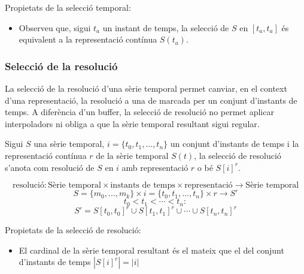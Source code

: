 Propietats de la selecció temporal:

\begin{itemize}
\item Observeu que, sigui $t_a$ un instant de temps, la selecció de $S$ en $[t_a,t_a]$ és equivalent a la representació contínua $S(t_a)$. 
\end{itemize}




\subsubsection{Selecció de la resolució}

La selecció de la resolució d'una sèrie temporal permet canviar, en el
context d'una representació, la resolució a una de marcada per un
conjunt d'instants de temps. A diferència d'un buffer, la selecció de
resolució no permet aplicar interpoladors ni obliga a que la sèrie
temporal resultant sigui regular.

Sigui $S$ una sèrie temporal, $i= \{t_0,t_1,\dotsc,t_n\}$ un conjunt
d'instants de temps i la representació contínua $r$ de la sèrie
temporal $S(t)$, la selecció de resolució s'anota com resolució de $S$
en $i$ amb representació $r$ o bé $S[i]^r$.

\begin{definition}
  \[
  \text{resolució}: \text{Sèrie temporal} \times \text{instants de
    temps} \times \text{representació} \longrightarrow \text{Sèrie
    temporal}
  \]
  \[
  S = \{m_0 , \ldots , m_k\} \times i = \{t_0,t_1,\dotsc,t_n\} \times r
  \longrightarrow S'
  \]
  \[
  t_0 < t_1 < \dotsb < t_n:
  \]
  \[
  S' = S[t_0,t_0]^r \cup  S[t_1,t_1]^r \cup \dotsb \cup S[t_{n},t_n]^r
  \] 
\end{definition}



Propietats de la selecció de resolució:
\begin{itemize}
\item El cardinal de la sèrie temporal resultant és el mateix que el del conjunt d'instants de temps $|S[i]^r| = |i|$
\end{itemize}





